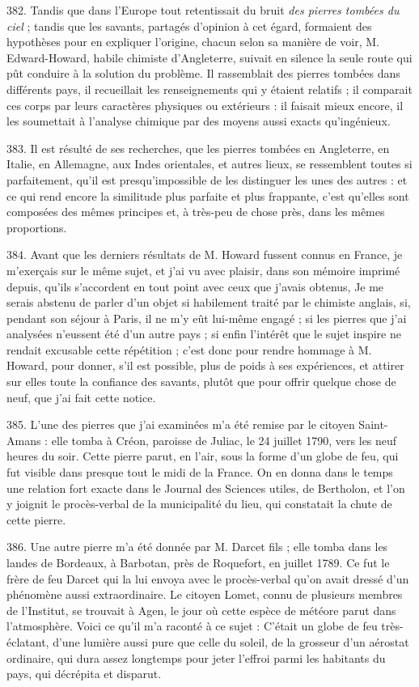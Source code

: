 \documentclass[a4paper, 11pt, oneside, polutonikogreek, french]{article}
\begin{document}
382. Tandis que dans l'Europe tout retentissait du bruit \emph{des pierres tombées du ciel} ; tandis que les savants, partagés d'opinion à cet égard, formaient des hypothèses pour en expliquer l'origine, chacun selon sa manière de voir, M. Edward-Howard, habile chimiste d'Angleterre, suivait en silence la seule route qui pût conduire à la solution du problème. Il rassemblait des pierres tombées dans différents pays, il recueillait les renseignements qui y étaient relatifs ; il comparait ces corps par leurs caractères physiques ou extérieurs : il faisait mieux encore, il les soumettait à l'analyse chimique par des moyens aussi exacts qu'ingénieux.

383. Il est résulté de ses recherches, que les pierres tombées en Angleterre, en Italie, en Allemagne, aux Indes orientales, et autres lieux, se ressemblent toutes si parfaitement, qu'il est presqu'impossible de les distinguer les unes des autres : et ce qui rend encore la similitude plus parfaite et plus frappante, c'est qu'elles sont composées des mêmes principes et, à très-peu de chose près, dans les mêmes proportions.

384. Avant que les derniers résultats de M. Howard fussent connus en France, je m'exerçais sur le même sujet, et j'ai vu avec plaisir, dans son mémoire imprimé depuis, qu'ils s'accordent en tout point avec ceux que j'avais obtenus, Je me serais abstenu de parler d'un objet si habilement traité par le chimiste anglais, si, pendant son séjour à Paris, il ne m'y eût lui-même engagé ; si les pierres que j'ai analysées n'eussent été d'un autre pays ; si enfin l'intérêt que le sujet inspire ne rendait excusable cette répétition ; c'est donc pour rendre hommage à M. Howard, pour donner, s'il est possible, plus de poids à ses expériences, et attirer sur elles toute la confiance des savants, plutôt que pour offrir quelque chose de neuf, que j'ai fait cette notice.

385. L'une des pierres que j'ai examinées m'a été remise par le citoyen Saint-Amans : elle tomba à Créon, paroisse de Juliac, le 24 juillet 1790, vers les neuf heures du soir. Cette pierre parut, en l'air, sous la forme d'un globe de feu, qui fut visible dans presque tout le midi de la France. On en donna dans le temps une relation fort exacte dans le Journal des Sciences utiles, de Bertholon, et l'on y joignit le procès-verbal de la municipalité du lieu, qui constatait la chute de cette pierre.

386. Une autre pierre m'a été donnée par M. Darcet fils ; elle tomba dans les landes de Bordeaux, à Barbotan, près de Roquefort, en juillet 1789. Ce fut le frère de feu Darcet qui la lui envoya avec le procès-verbal qu'on avait dressé d'un phénomène aussi extraordinaire. Le citoyen Lomet, connu de plusieurs membres de l'Institut, se trouvait à Agen, le jour où cette espèce de météore parut dans l'atmosphère. Voici ce qu'il m'a raconté à ce sujet : \og C'était un globe de feu très-éclatant, d'une lumière aussi pure que celle du soleil, de la grosseur d'un aérostat ordinaire, qui dura assez longtemps pour jeter l'effroi parmi les habitants du pays, qui décrépita et disparut. \fg
\end{document}
